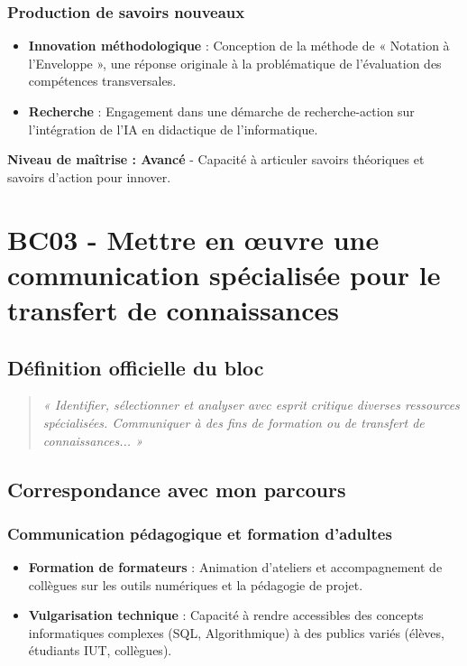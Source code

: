 \subsubsection{Production de savoirs nouveaux}
\begin{itemize}[leftmargin=*]
    \item \textbf{Innovation méthodologique} : Conception de la méthode de « Notation à l'Enveloppe », une réponse originale à la problématique de l'évaluation des compétences transversales.
    \item \textbf{Recherche} : Engagement dans une démarche de recherche-action sur l'intégration de l'IA en didactique de l'informatique.
\end{itemize}

\textbf{Niveau de maîtrise : Avancé} - Capacité à articuler savoirs théoriques et savoirs d'action pour innover.

\vspace{1cm}

\section{BC03 - Mettre en œuvre une communication spécialisée pour le transfert de connaissances}

\subsection{Définition officielle du bloc}
\begin{quote}
\textit{« Identifier, sélectionner et analyser avec esprit critique diverses ressources spécialisées. Communiquer à des fins de formation ou de transfert de connaissances... »} \parencite{rncp38152}
\end{quote}

\subsection{Correspondance avec mon parcours}

\subsubsection{Communication pédagogique et formation d'adultes}
\begin{itemize}[leftmargin=*]
    \item \textbf{Formation de formateurs} : Animation d'ateliers et accompagnement de collègues sur les outils numériques et la pédagogie de projet.
    \item \textbf{Vulgarisation technique} : Capacité à rendre accessibles des concepts informatiques complexes (SQL, Algorithmique) à des publics variés (élèves, étudiants IUT, collègues).
\end{itemize}


